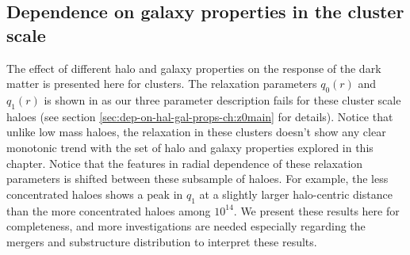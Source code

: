     
    








\subsection{Dependence on galaxy properties in the cluster scale}
\label{sec:depend_hal_gal_props_cluster}
The effect of different halo and galaxy properties on the response of the dark matter is presented here for clusters. The relaxation parameters $q_0(r)$ and $q_1(r)$ is shown in  as our three parameter description fails for these cluster scale haloes (see section \ref{sec:dep-on-hal-gal-props-ch:z0main} for details). Notice that unlike low mass haloes, the relaxation in these clusters doesn't show any clear monotonic trend with the set of halo and galaxy properties explored in this chapter. Notice that the features in radial dependence of these relaxation parameters is shifted between these subsample of haloes. For example, the less concentrated haloes shows a peak in $q_{1}$ at a slightly larger halo-centric distance than the more concentrated haloes among $10^{14}$. We present these results here for completeness, and more investigations are needed especially regarding the mergers and substructure distribution to interpret these results.  

